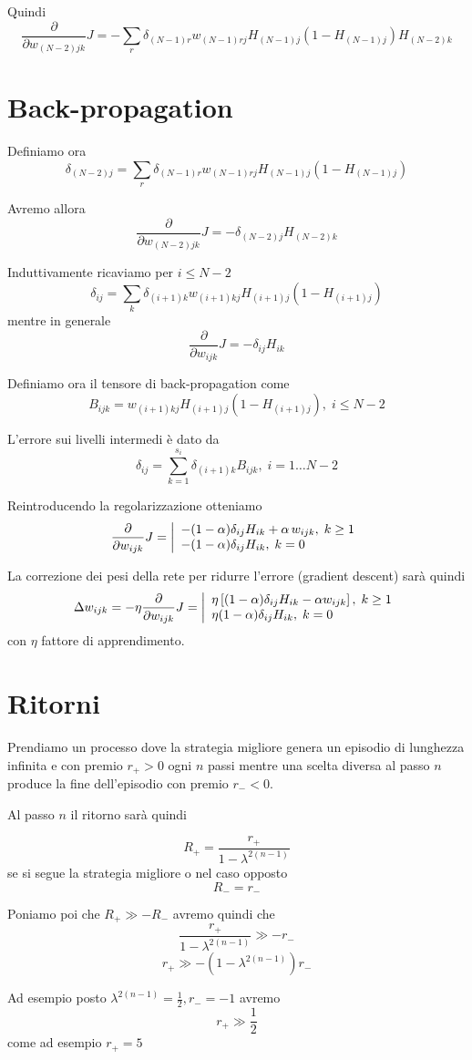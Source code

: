 \documentclass[a4paper,11pt]{article}
\begin{document}
Quindi
\[
	\frac{\partial}{\partial w_{(N-2)jk}} J =
	- \sum_r \delta_{(N-1)r} w_{(N-1)rj}
	H_{(N-1)j} (1 - H_{(N-1)j}) H_{(N-2)k}
\]

\section{Back-propagation}

Definiamo ora
\[
	\delta_{(N-2)j} =
	\sum_r \delta_{(N-1)r} w_{(N-1)rj} H_{(N-1)j} (1 - H_{(N-1)j})
\]

Avremo allora
\[
	\frac{\partial}{\partial w_{(N-2)jk}} J =
	- \delta_{(N-2)j}  H_{(N-2)k}
\]

Induttivamente ricaviamo per $ i \le N - 2 $ 
\[
	\delta_{ij} =
	\sum_k \delta_{(i+1)k} w_{(i+1)kj} H_{(i+1)j} (1 - H_{(i+1)j})
\]
mentre in generale
\[
	\frac{\partial}{\partial w_{ijk}} J =
	- \delta_{ij} H_{ik}
\]

Definiamo ora il tensore di back-propagation come 
\[
  B_{ijk} =  w_{(i+1)kj} H_{(i+1)j} (1 - H_{(i+1)j}), \; i \le N-2
\]

L'errore sui livelli intermedi è dato da
\[
  \delta_{ij} = \sum_{k=1}^{s_i} \delta_{(i+1)k} B_{ijk},\; i = 1 \dots N-2
\]

Reintroducendo la regolarizzazione otteniamo
\[
	\frac{\partial}{\partial w_{ijk}} J =\left|
    \begin{array}l
		-(1 - \alpha) \delta_{ij} H_{ik} + \alpha \, w_{ijk}, \; k \ge 1
	      \\
		-(1 - \alpha) \delta_{ij} H_{ik}, \; k =0
    \end{array}
  \right.
\]

La correzione dei pesi della rete per ridurre l'errore (gradient descent) sarà quindi
\[
  \Delta w_{ijk}  = -\eta \frac{\partial}{\partial w_{ijk}} J = \left|
  \begin{array}l
    \eta \left[ (1 - \alpha) \delta_{ij} H_{ik} - \alpha w_{ijk} \right], \; k \ge 1
    \\
    \eta (1 - \alpha) \delta_{ij} H_{ik}, \; k = 0
  \end{array}
  \right.
\]
con $ \eta $ fattore di apprendimento.

\section{Ritorni}

Prendiamo un processo dove la strategia migliore genera un episodio 
di lunghezza infinita e con premio $ r_+ > 0 $ ogni $ n $ passi mentre una scelta diversa al passo $ n $ produce la fine dell'episodio con premio $ r_- < 0 $. 

Al passo $ n $ il ritorno sarà quindi

\[ 
	R_+ = \frac{r_+}{1 - \lambda ^ {2 (n -1)}}
 \]
se si segue la strategia migliore o nel caso opposto
\[ 
R_- = r_-
\]

Poniamo poi che $ R_+ \gg -R_- $ avremo quindi che
\[ 
	\frac{r_+}{1 - \lambda ^ {2 (n -1)}} \gg -r_-
\]
\[ 
	r_+ \gg -(1 - \lambda ^ {2 (n -1)}) r_-
\]

Ad esempio posto $ \lambda ^ {2 (n -1)} = \frac{1}{2}, r_- = -1 $ avremo
\[ 
r_+ \gg \frac{1}{2}
\]
come ad esempio $ r_+ = 5 $
\]
\end{document}
